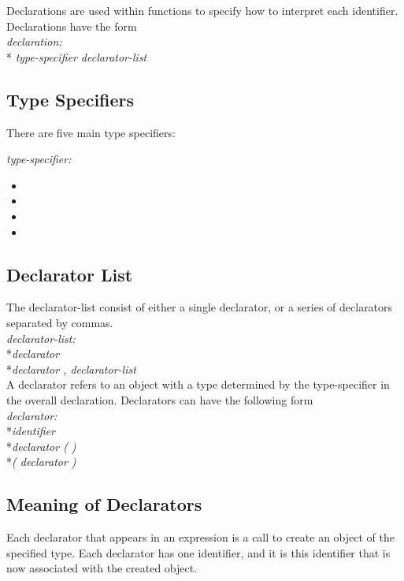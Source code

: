 Declarations are used within functions to specify how to interpret each identifier. Declarations have the form\\

	\textit{ declaration: }
		\\*\indent\indent\textit{ type-specifier declarator-list}

\subsection{Type Specifiers}

There are five main type specifiers:

	\textit{type-specifier: }
\begin{itemize}[~]
  \item \integ
  \item \float
  \item \complex
  \item \mat
\end{itemize}

\subsection{ Declarator List }
The declarator-list consist of either a single declarator, or a series of declarators separated by commas.\\

	\textit{declarator-list:}
		\\*\indent\indent\textit{declarator}
		\\*\indent\indent\textit{declarator , declarator-list}\\

A declarator refers to an object with a type determined by the type-specifier in the overall declaration. Declarators can have the following form\\

	\textit{declarator:}
		\\*\indent\indent\textit{identifier}
		\\*\indent\indent\textit{declarator ( )}
		\\*\indent\indent\textit{( declarator )}\\

\subsection{ Meaning of Declarators }
Each declarator that appears in an expression is a call to create an object of the specified type. Each declarator has one identifier, and it is this identifier that is now associated with the created object. 

